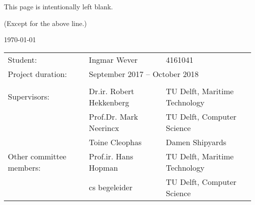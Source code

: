 {
	
	\clearpage
	\thispagestyle{empty}
	\vspace*{6cm}
	\begin{center}
		This page is intentionally left blank.
		
		\tiny{(Except for the above line.)}

	\end{center}

	\begin{titlepage}
		\newpage
		\setcounter{page}{0}
		
		\centering
		\Large
		\vspace*{2cm}
		\doctitle
		\large
		\vspace{1cm}
		\today
		
		\vspace{6cm}
		\normalsize
		\begin{tabular}{lll}
			Student: & Ingmar Wever & 4161041 \\
			Project duration: & \multicolumn{2}{l}{September 2017 -- October 2018} \\
			& & \\
			Supervisors: & Dr.ir. Robert Hekkenberg & TU Delft, Maritime Technology \\
			& Prof.Dr. Mark Neerincx & TU Delft, Computer Science \\
			& Toine Cleophas & Damen Shipyards \\
			Other committee members: & Prof.ir. Hans Hopman & TU Delft, Maritime Technology \\
			& cs begeleider & TU Delft, Computer Science \\
		\end{tabular}

\end{titlepage}
		
}
	